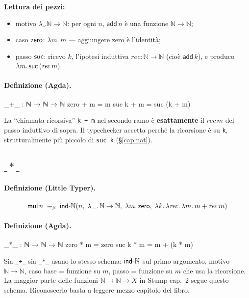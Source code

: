 \noindent\textbf{Lettura dei pezzi:}
\begin{itemize}
\item motivo $\lambda\_.\mathbb{N}\to\mathbb{N}$: per ogni $n$, $\mathsf{add}\,n$ \`e una funzione $\mathbb{N}\to\mathbb{N}$;
\item caso $\mathsf{zero}$: $\lambda m.\,m$ --- aggiungere zero \`e l'identit\`a;
\item passo $\mathsf{suc}$: ricevo $k$, l'ipotesi induttiva $\mathit{rec} : \mathbb{N}\to\mathbb{N}$ (cio\`e $\mathsf{add}\,k$), e produco $\lambda m.\,\mathsf{suc}\,(\mathit{rec}\,m)$.
\end{itemize}

\paragraph{Definizione (Agda).}
\begin{agda}
_+_ : ℕ → ℕ → ℕ
zero  + m = m
suc k + m = suc (k + m)
\end{agda}

La ``chiamata ricorsiva'' \texttt{k + m} nel secondo ramo \`e \textbf{esattamente} il $\mathit{rec}\,m$ del passo induttivo di sopra. Il typechecker accetta perch\'e la ricorsione \`e su \texttt{k}, strutturalmente pi\`u piccolo di \texttt{suc k} (\S\ref{cap:nat}).

\subsection*{$\_*\_$}

\paragraph{Definizione (Little Typer).}
\[
\mathsf{mul}\,n \;\equiv_{\beta}\; \mathsf{ind\text{-}\mathbb{N}}(n,\;\lambda\_.\,\mathbb{N}\to\mathbb{N},\;\lambda m.\,\mathsf{zero},\;\lambda k.\,\lambda \mathit{rec}.\,\lambda m.\,m + \mathit{rec}\,m)
\]

\paragraph{Definizione (Agda).}
\begin{agda}
_*_ : ℕ → ℕ → ℕ
zero  * m = zero
suc k * m = m + (k * m)
\end{agda}

\begin{oss}
Sia \texttt{\_+\_} sia \texttt{\_*\_} usano lo stesso schema: $\mathsf{ind\text{-}\mathbb{N}}$ sul primo argomento, motivo $\mathbb{N}\to\mathbb{N}$, caso base = funzione su $m$, passo = funzione su $m$ che usa la ricorsione. La maggior parte delle funzioni $\mathbb{N}\to\mathbb{N}\to X$ in Stump cap.~2 segue questo schema. Riconoscerlo basta a leggere mezzo capitolo del libro.
\end{oss}

